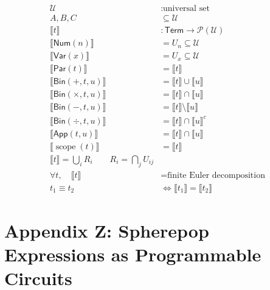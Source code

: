 \documentclass[11pt,oneside]{article}
\begin{document}
\begin{align}
\mathcal{U} &: \text{universal set} \\[6pt]
A,B,C &\subseteq \mathcal{U} \\[10pt]

\llbracket t \rrbracket
&:
\mathsf{Term} \to \mathcal{P}(\mathcal{U})
\\[12pt]

\llbracket \mathsf{Num}(n) \rrbracket
&=
U_n \subseteq \mathcal{U}
\\[10pt]

\llbracket \mathsf{Var}(x) \rrbracket
&=
U_x \subseteq \mathcal{U}
\\[12pt]

\llbracket \mathsf{Par}(t) \rrbracket
&=
\llbracket t \rrbracket
\\[12pt]

\llbracket \mathsf{Bin}(+,t,u) \rrbracket
&=
\llbracket t \rrbracket \cup \llbracket u \rrbracket
\\[10pt]

\llbracket \mathsf{Bin}(\times,t,u) \rrbracket
&=
\llbracket t \rrbracket \cap \llbracket u \rrbracket
\\[10pt]

\llbracket \mathsf{Bin}(-,t,u) \rrbracket
&=
\llbracket t \rrbracket \setminus \llbracket u \rrbracket
\\[10pt]

\llbracket \mathsf{Bin}(\div,t,u) \rrbracket
&=
\llbracket t \rrbracket \cap \llbracket u \rrbracket^{c}
\\[12pt]

\llbracket \mathsf{App}(t,u) \rrbracket
&=
\llbracket t \rrbracket \cap \llbracket u \rrbracket
\\[14pt]

\llbracket \operatorname{scope}(t) \rrbracket
&=
\llbracket t \rrbracket
\\[12pt]

\llbracket t \rrbracket
=
\bigcup_{i}
R_i
\qquad
R_i = \bigcap_{j}
U_{ij}
\\[12pt]

\forall t,\quad
\llbracket t \rrbracket
&=
\text{finite Euler decomposition}
\\[14pt]

t_1 \equiv t_2
&\Longleftrightarrow
\llbracket t_1 \rrbracket = \llbracket t_2 \rrbracket
\end{align}

\section{Appendix Z: Spherepop Expressions as Programmable Circuits}
\end{document}
